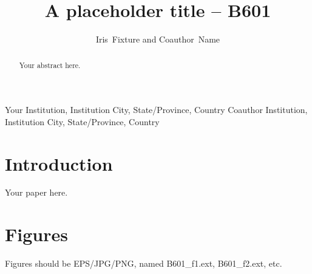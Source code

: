 \documentclass[11pt,twoside]{article}
\begin{document}
\title{A placeholder title -- B601}

\author{Iris~Fixture and Coauthor~Name}
Your Institution, Institution City, State/Province, Country
Coauthor Institution, Institution City, State/Province, Country



\begin{abstract}
Your abstract here.
\end{abstract}

\section{Introduction}

Your paper here.

\section{Figures}

Figures should be EPS/JPG/PNG, named B601\_f1.ext, B601\_f2.ext, etc.

% 
\end{document}
